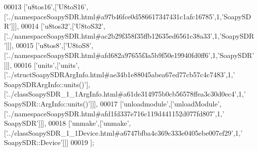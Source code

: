 \begin{DoxyCode}
00013   [\textcolor{stringliteral}{'u8tos16'},[\textcolor{stringliteral}{'U8toS16'},[\textcolor{stringliteral}{'../namespaceSoapySDR.html#a97b46fce0d586617347431c1afc16785'},1,\textcolor{stringliteral}{'SoapySDR'}]]],
00014   [\textcolor{stringliteral}{'u8tos32'},[\textcolor{stringliteral}{'U8toS32'},[\textcolor{stringliteral}{'../namespaceSoapySDR.html#ac2b29f358f35ffb12635ed6561c38a33'},1,\textcolor{stringliteral}{'SoapySDR'}]]],
00015   [\textcolor{stringliteral}{'u8tos8'},[\textcolor{stringliteral}{'U8toS8'},[\textcolor{stringliteral}{'../namespaceSoapySDR.html#afd682a97655f3a5b9f50e19940fd0ff6'},1,\textcolor{stringliteral}{'SoapySDR'}]]],
00016   [\textcolor{stringliteral}{'units'},[\textcolor{stringliteral}{'units'},[\textcolor{stringliteral}{'../structSoapySDRArgInfo.html#ae34b1e88045abea67ed77cb57c4c7483'},1,\textcolor{stringliteral}{'
      SoapySDRArgInfo::units()'}],[\textcolor{stringliteral}{'../classSoapySDR\_1\_1ArgInfo.html#a61de314975b0cb56578ffea3c30d0ec4'},1,\textcolor{stringliteral}{'
      SoapySDR::ArgInfo::units()'}]]],
00017   [\textcolor{stringliteral}{'unloadmodule'},[\textcolor{stringliteral}{'unloadModule'},[\textcolor{stringliteral}{'../namespaceSoapySDR.html#afd1fd337e716c119d441152d077fd807'},1,\textcolor{stringliteral}{'
      SoapySDR'}]]],
00018   [\textcolor{stringliteral}{'unmake'},[\textcolor{stringliteral}{'unmake'},[\textcolor{stringliteral}{'../classSoapySDR\_1\_1Device.html#a6747bfba4c369c333e0405ebe007ef29'},1,\textcolor{stringliteral}{'
      SoapySDR::Device'}]]]
00019 ];
\end{DoxyCode}

